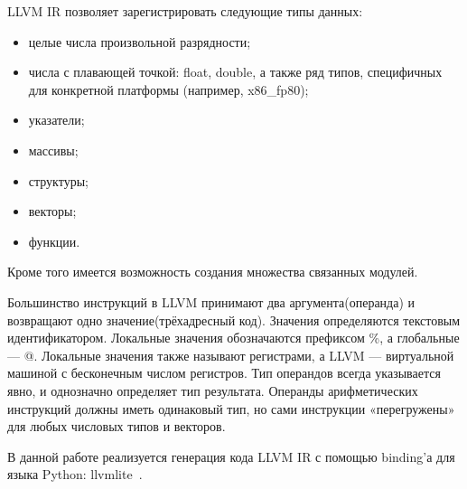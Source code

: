 LLVM IR позволяет зарегистрировать следующие типы данных:
\begin{itemize}
    \item целые числа произвольной разрядности;
    \item числа с плавающей точкой: float, double, а также ряд типов,
    специфичных для конкретной платформы (например, x86\_fp80);
    \item указатели;
    \item массивы;
    \item структуры;
    \item векторы;
    \item функции.
\end{itemize}
Кроме того имеется возможность создания множества связанных модулей.

Большинство инструкций в LLVM принимают два аргумента(операнда) и возвращают одно значение(трёхадресный код).
Значения определяются текстовым идентификатором.
Локальные значения обозначаются префиксом \%, а глобальные — @.
Локальные значения также называют регистрами, а LLVM — виртуальной машиной с бесконечным числом регистров.
Тип операндов всегда указывается явно, и однозначно определяет тип результата.
Операнды арифметических инструкций должны иметь одинаковый тип, но сами инструкции «перегружены» для любых числовых типов и векторов.

В данной работе реализуется генерация кода LLVM IR с помощью binding'а для языка Python: llvmlite~\cite{llvm}.
